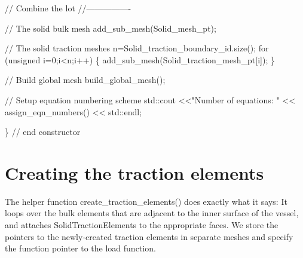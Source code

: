 \begin{DoxyCodeInclude}


 \textcolor{comment}{// Combine the lot}
 \textcolor{comment}{//----------------}
 
 \textcolor{comment}{// The solid bulk mesh}
 add\_sub\_mesh(Solid\_mesh\_pt);

 \textcolor{comment}{// The solid traction meshes}
 n=Solid\_traction\_boundary\_id.size();
 \textcolor{keywordflow}{for} (\textcolor{keywordtype}{unsigned} i=0;i<n;i++)
  \{
   add\_sub\_mesh(Solid\_traction\_mesh\_pt[i]);
  \}

 \textcolor{comment}{// Build global mesh}
 build\_global\_mesh();

 \textcolor{comment}{// Setup equation numbering scheme}
 std::cout <<\textcolor{stringliteral}{"Number of equations: "} << assign\_eqn\_numbers() << std::endl; 
 
\} \textcolor{comment}{// end constructor}

\end{DoxyCodeInclude}




 

\hypertarget{index_traction}{}\section{Creating the traction elements}\label{index_traction}
The helper function {\ttfamily create\+\_\+traction\+\_\+elements()} does exactly what it says\+: It loops over the bulk elements that are adjacent to the inner surface of the vessel, and attaches {\ttfamily Solid\+Traction\+Elements} to the appropriate faces. We store the pointers to the newly-\/created traction elements in separate meshes and specify the function pointer to the load function.


